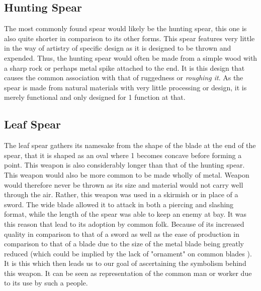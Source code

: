 \documentclass{article}
\begin{document}
\subsection*{Hunting Spear}
The most commonly found spear would likely be the hunting spear, this one is also quite shorter in comparison to its other forms. This spear features very little in the way of artistry of specific design as it is designed to be thrown and expended. Thus, the hunting spear would often be made from a simple wood with a sharp rock or perhaps metal spike attached to the end. It is this design that causes the common association with that of ruggedness or \textit{roughing it}. As the spear is made from natural materials with very little processing or design, it is merely functional and only designed for 1 function at that.

\subsection*{Leaf Spear}
The leaf spear gathers its namesake from the shape of the blade at the end of the spear, that it is shaped as an oval where 1 becomes concave before forming a point. This weapon is also considerably longer than that of the hunting spear. This weapon would also be more common to be made wholly of metal. Weapon would therefore never be thrown as its size and material would not carry well through the air. Rather, this weapon was used in a skirmish or in place of a sword. The wide blade allowed it to attack in both a piercing and slashing format, while the length of the spear was able to keep an enemy at bay. It was this reason that lead to its adoption by common folk. Because of its increased quality in comparison to that of a sword as well as the ease of production in comparison to that of a blade due to the size of the metal blade being greatly reduced (which could be implied by the lack of "ornament" on common blades \parencite{coffey1893notes}). It is this which then leads us to our goal of ascertaining the symbolism behind this weapon. It can be seen as representation of the common man or worker due to its use by such a people.
\end{document}
